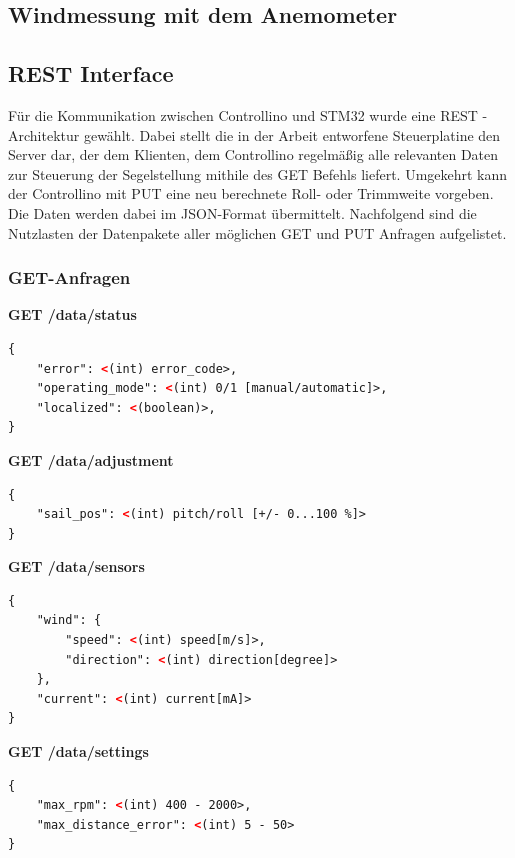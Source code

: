 \subsection{Windmessung mit dem Anemometer}
\subsection{REST Interface}
Für die Kommunikation zwischen Controllino und STM32 wurde eine REST - Architektur gewählt. Dabei stellt die in der Arbeit entworfene Steuerplatine den Server dar, der dem Klienten, dem Controllino regelmäßig alle relevanten Daten zur Steuerung der Segelstellung mithile des GET Befehls liefert. Umgekehrt kann der Controllino mit PUT eine neu berechnete Roll- oder Trimmweite vorgeben. Die Daten werden dabei im JSON-Format übermittelt. Nachfolgend sind die Nutzlasten der Datenpakete aller möglichen GET und PUT Anfragen aufgelistet.
 
\subsubsection{GET-Anfragen}
\textbf{GET /data/status}
\begin{lstlisting}[language=XML, caption={GET-Request 1}]
{
	"error": <(int) error_code>,
	"operating_mode": <(int) 0/1 [manual/automatic]>,
	"localized": <(boolean)>,
}
\end{lstlisting}
\textbf{GET /data/adjustment}
\begin{lstlisting}[language=XML, caption={GET-Request 2}]
{
	"sail_pos": <(int) pitch/roll [+/- 0...100 %]>
}
\end{lstlisting}
\textbf{GET /data/sensors}
\begin{lstlisting}[language=XML, caption={GET-Request 3}]
{
	"wind": {
		"speed": <(int) speed[m/s]>,
		"direction": <(int) direction[degree]>
	},
	"current": <(int) current[mA]>
}
\end{lstlisting}
\textbf{GET /data/settings}
\begin{lstlisting}[language=XML, caption={GET-Request 4}]
{
	"max_rpm": <(int) 400 - 2000>,
	"max_distance_error": <(int) 5 - 50>
}
\end{lstlisting}

